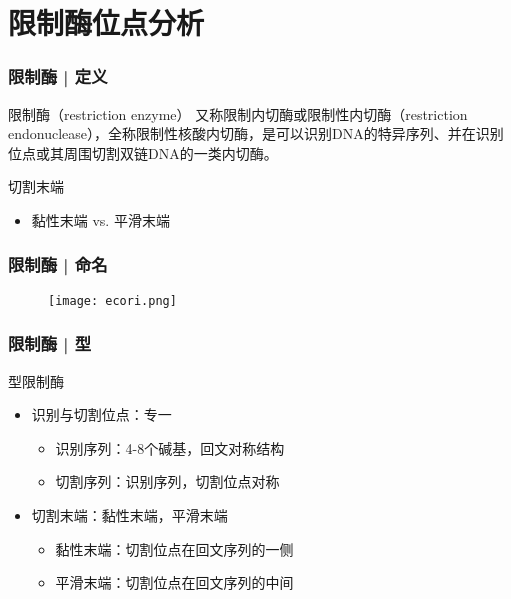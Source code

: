 \section{限制酶位点分析}
\begin{frame}
  \frametitle{限制酶 | 定义}
  \begin{block}{限制酶（restriction enzyme）}
    又称限制内切酶或限制性内切酶（restriction endonuclease），全称限制性核酸内切酶，是可以识别DNA的特异序列、并在识别位点或其周围切割双链DNA的一类内切酶。
  \end{block}
  \pause
  \begin{block}{切割末端}
    \begin{itemize}
      \item 黏性末端 vs. 平滑末端
    \end{itemize}
  \end{block}
  \begin{figure}
    \centering
  \end{figure}
\end{frame}

\begin{frame}
  \frametitle{限制酶 | \alert{命名}}
  \begin{figure}
    \centering
    \texttt{[image: ecori.png]}
  \end{figure}
\end{frame}

\begin{frame}
  \frametitle{限制酶 | \alert{型}}
  \begin{block}{型限制酶}
  \begin{itemize}
    \item 识别与切割位点：专一
      \begin{itemize}
        \item 识别序列：4-8个碱基，回文对称结构
        \item 切割序列：识别序列，切割位点对称
      \end{itemize}
    \item 切割末端：黏性末端，平滑末端
      \begin{itemize}
        \item 黏性末端：切割位点在回文序列的一侧
        \item 平滑末端：切割位点在回文序列的中间
      \end{itemize}
  \end{itemize}
  \end{block}
\end{frame}

